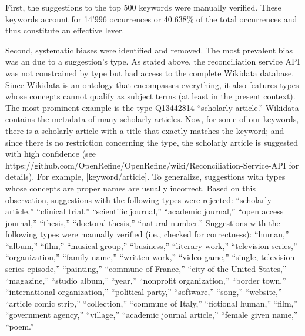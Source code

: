 First, the suggestions to the top 500 keywords were manually verified.
These keywords account for 14'996 occurrences or 40.638\% of the total
occurrences and thus constitute an effective lever.

Second, systematic biases were identified and removed. The most
prevalent bias was an due to a suggestion's type. As stated above, the
reconciliation service API was not constrained by type but had access to
the complete Wikidata database. Since Wikidata is an ontology that
encompasses everything, it also features types whose concepts cannot
qualify as subject terms (at least in the present context). The most
prominent example is the type Q13442814 ``scholarly article.'' Wikidata
contains the metadata of many scholarly articles. Now, for some of our
keywords, there is a scholarly article with a title that exactly matches
the keyword; and since there is no restriction concerning the type, the
scholarly article is suggested with high confidence (see
https://github.com/OpenRefine/OpenRefine/wiki/Reconciliation-Service-API
for details). For example, {[}keyword/article{]}. To generalize,
suggestions with types whose concepts are proper names are usually
incorrect. Based on this observation, suggestions with the following
types were rejected: ``scholarly article,'' ``clinical trial,''
``scientific journal,'' ``academic journal,'' ``open access journal,''
``thesis,'' ``doctoral thesis,'' ``natural number.'' Suggestions with
the following types were manually verified (i.e., checked for
correctness): ``human,'' ``album,'' ``film,'' ``musical group,''
``business,'' ``literary work,'' ``television series,''
``organization,'' ``family name,'' ``written work,'' ``video game,''
``single, television series episode,'' ``painting,'' ``commune of
France,'' ``city of the United States,'' ``magazine,'' ``studio album,''
``year,'' ``nonprofit organization,'' ``border town,'' ``international
organization,'' ``political party,'' ``software,'' ``song,''
``website,'' ``article comic strip,'' ``collection,'' ``commune of
Italy,'' ``fictional human,'' ``film,'' ``government agency,''
``village,'' ``academic journal article,'' ``female given name,''
``poem.''

